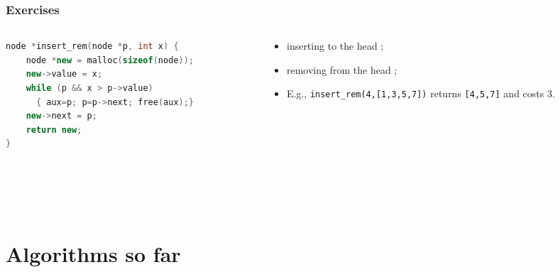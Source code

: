 \documentclass[aspectratio=169]{beamer}
\begin{document}
\begin{frame}[fragile]\frametitle{Exercises}
    
\begin{columns}
\begin{column}{0.50\textwidth}
\begin{lstlisting}[language=C++,emph={insert_rem,malloc,free}]
  node *insert_rem(node *p, int x) {
    node *new = malloc(sizeof(node));
    new->value = x;
    while (p && x > p->value)
      { aux=p; p=p->next; free(aux);}
    new->next = p;
    return new;
}
\end{lstlisting}
\end{column}
\begin{column}{0.51\textwidth}
\begin{itemize}
    \item \alert{inserting} to the head ;
    \item \alert{removing} from the head ;
    \item E.g., \texttt{insert\_rem(4,[1,3,5,7])} returns \texttt{[4,5,7]} and costs 3.
  \end{itemize}
\end{column}
\end{columns}

~\\[-5mm]
~\\[-10mm]
~\\[-10mm]
\end{frame}



\section{Algorithms so far}
\end{document}
